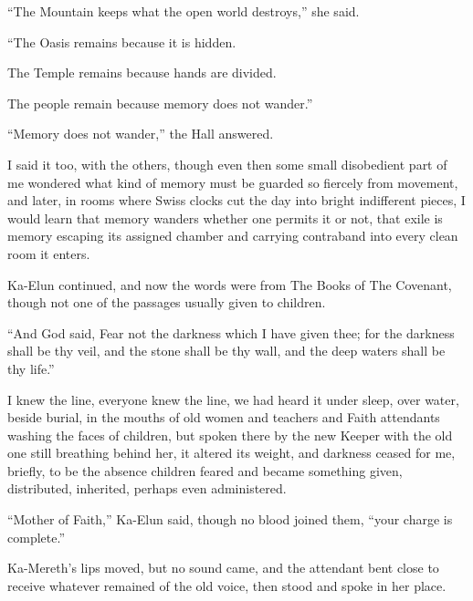 “The Mountain keeps what the open world destroys,” she said.\par
“The Oasis remains because it is hidden.\par
The Temple remains because hands are divided.\par
The people remain because memory does not wander.”\par
“Memory does not wander,” the Hall answered.\par

I said it too, with the others, though even then some small disobedient part of me wondered what 
kind of memory must be guarded so fiercely from movement, and later, in rooms where Swiss clocks cut the 
day into bright indifferent pieces, I would learn that memory wanders whether one permits it or not, 
that exile is memory escaping its assigned chamber and carrying contraband into every clean room it enters.\par


Ka-Elun continued, and now the words were from The Books of The Covenant, though not one of the 
passages usually given to children.\par

\begin{scripture}
“And God said, Fear not the darkness which I have given thee; for the darkness shall be thy veil, and the stone shall be thy wall, and the deep waters shall be thy life.”
\end{scripture}

I knew the line, everyone knew the line, we had heard it under sleep, over water, beside burial, 
in the mouths of old women and teachers and Faith attendants washing the faces of children, but 
spoken there by the new Keeper with the old one still breathing behind her, it altered its weight, 
and darkness ceased for me, briefly, to be the absence children feared and became something given, 
distributed, inherited, perhaps even administered.\par

“Mother of Faith,” Ka-Elun said, though no blood joined them, “your charge is complete.”\par

Ka-Mereth’s lips moved, but no sound came, and the attendant bent close to receive whatever 
remained of the old voice, then stood and spoke in her place.\par

